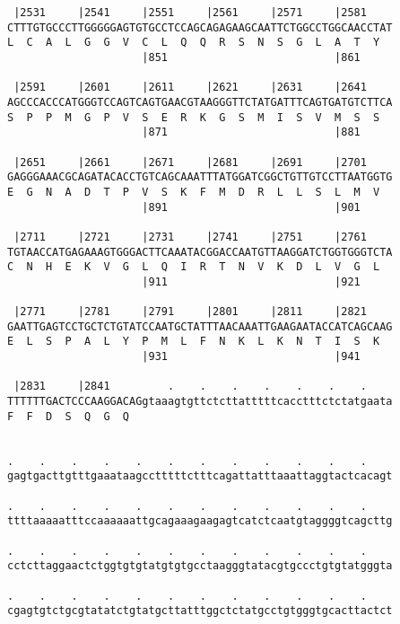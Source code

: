 \documentclass{article}
\begin{document}
\begin{Verbatim}
 |2531     |2541     |2551     |2561     |2571     |2581    
CTTTGTGCCCTTGGGGGAGTGTGCCTCCAGCAGAGAAGCAATTCTGGCCTGGCAACCTAT
L  C  A  L  G  G  V  C  L  Q  Q  R  S  N  S  G  L  A  T  Y  
                     |851                          |861     
  
 |2591     |2601     |2611     |2621     |2631     |2641    
AGCCCACCCATGGGTCCAGTCAGTGAACGTAAGGGTTCTATGATTTCAGTGATGTCTTCA
S  P  P  M  G  P  V  S  E  R  K  G  S  M  I  S  V  M  S  S  
                     |871                          |881     
  
 |2651     |2661     |2671     |2681     |2691     |2701    
GAGGGAAACGCAGATACACCTGTCAGCAAATTTATGGATCGGCTGTTGTCCTTAATGGTG
E  G  N  A  D  T  P  V  S  K  F  M  D  R  L  L  S  L  M  V  
                     |891                          |901     
  
 |2711     |2721     |2731     |2741     |2751     |2761    
TGTAACCATGAGAAAGTGGGACTTCAAATACGGACCAATGTTAAGGATCTGGTGGGTCTA
C  N  H  E  K  V  G  L  Q  I  R  T  N  V  K  D  L  V  G  L  
                     |911                          |921     
  
 |2771     |2781     |2791     |2801     |2811     |2821    
GAATTGAGTCCTGCTCTGTATCCAATGCTATTTAACAAATTGAAGAATACCATCAGCAAG
E  L  S  P  A  L  Y  P  M  L  F  N  K  L  K  N  T  I  S  K  
                     |931                          |941     
  
 |2831     |2841         .    .    .    .    .    .    .    
TTTTTTGACTCCCAAGGACAGgtaaagtgttctcttatttttcacctttctctatgaata
F  F  D  S  Q  G  Q                                         
                                                            
  
.    .    .    .    .    .    .    .    .    .    .    .    
gagtgacttgtttgaaataagcctttttctttcagattatttaaattaggtactcacagt
                                                            
.    .    .    .    .    .    .    .    .    .    .    .    
ttttaaaaatttccaaaaaattgcagaaagaagagtcatctcaatgtaggggtcagcttg
                                                            
.    .    .    .    .    .    .    .    .    .    .    .    
cctcttaggaactctggtgtgtatgtgtgcctaagggtatacgtgccctgtgtatgggta
                                                            
.    .    .    .    .    .    .    .    .    .    .    .    
cgagtgtctgcgtatatctgtatgcttatttggctctatgcctgtgggtgcacttactct
                                                            

\end{Verbatim}
\end{document}

